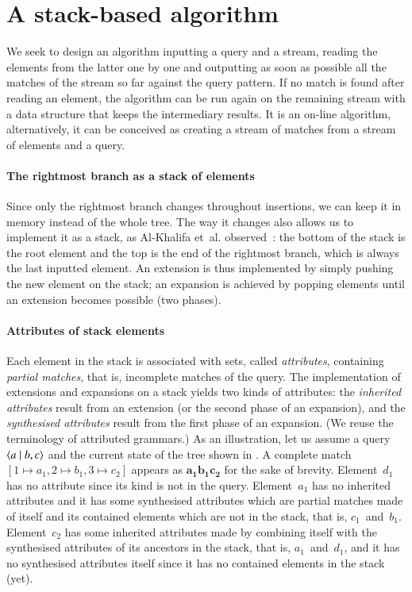 
\section{A stack-based algorithm}
\label{stack}

We seek to design an algorithm inputting a query and a stream, reading
the elements from the latter one by one and outputting as soon as
possible all the matches of the stream so far against the query
pattern. If no match is found after reading an element, the algorithm
can be run again on the remaining stream with a data structure that
keeps the intermediary results. It is an on\hyp{}line algorithm,
alternatively, it can be conceived as creating a stream of matches
from a stream of elements and a query.

\paragraph{The rightmost branch as a stack of elements}

Since only the rightmost branch changes throughout insertions, we can
keep it in memory instead of the whole \XML tree. The way it changes
also allows us to implement it as a stack, as Al-Khalifa et~al.\@
observed~\cite{AlKhalifa:2002}: the bottom of the stack is the root
element and the top is the end of the rightmost branch, which is
always the last inputted element. An extension is thus implemented by
simply pushing the new element on the stack; an expansion is achieved
by popping elements until an extension becomes possible (two phases).

\paragraph{Attributes of stack elements}

Each element in the stack is associated with sets, called
\emph{attributes}, containing \emph{partial matches}, that is,
incomplete matches of the query. The implementation of extensions and
expansions on a stack yields two kinds of attributes: the
\emph{inherited attributes} result from an extension (or the second
phase of an expansion), and the \emph{synthesised attributes} result
from the first phase of an expansion. (We reuse the terminology of
attributed grammars.) As an illustration, let us assume a query
\(\langle a \mid b,c\rangle\) and the current state of the \XML tree shown in
. A complete match \([1 \mapsto a_1, 2 \mapsto
  b_1, 3 \mapsto c_2]\) appears as \(\mathbf{a_1b_1c_2}\) for the sake
of brevity. Element~\(d_1\) has no attribute since its kind is not in
the query. Element~\(a_1\) has no inherited attributes and it has some
synthesised attributes which are partial matches made of itself and
its contained elements which are not in the stack, that is,
\(c_1\)~and~\(b_1\). Element~\(c_2\) has some inherited attributes
made by combining itself with the synthesised attributes of its
ancestors in the stack, that is, \(a_1\)~and~\(d_1\), and it has no
synthesised attributes itself since it has no contained elements in
the stack (yet).

